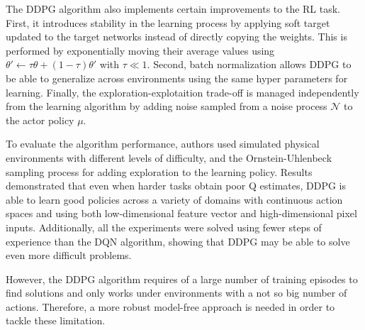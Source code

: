 The DDPG algorithm also implements certain improvements to the RL task. First, it introduces stability in the learning process by applying soft target updated to the target networks instead of directly copying the weights. This is performed by exponentially moving their average values using $\theta' \leftarrow \tau\theta + (1 - \tau)\theta'$ with $\tau \ll 1$. Second, batch normalization allows DDPG to be able to generalize across environments using the same hyper parameters for learning. Finally, the exploration-explotaition trade-off is managed independently from the learning algorithm by adding noise sampled from a noise process $\mathcal{N}$ to the actor policy $\mu$.
%
%

To evaluate the algorithm performance, authors used simulated physical environments with different levels of difficulty, and the Ornstein-Uhlenbeck \cite{bibbona2008ornstein} sampling process for adding exploration to the learning policy. Results demonstrated that even when harder tasks obtain poor Q estimates, DDPG is able to learn good policies across a variety of domains with continuous action spaces and using both low-dimensional feature vector and high-dimensional pixel inputs. Additionally, all the experiments were solved using fewer steps of experience than the DQN algorithm, showing that DDPG may be able to solve even more difficult problems.

However, the DDPG algorithm requires of a large number of training episodes to find solutions and only works under environments with a not so big number of actions. Therefore, a more robust model-free approach is needed in order to tackle these limitation.

